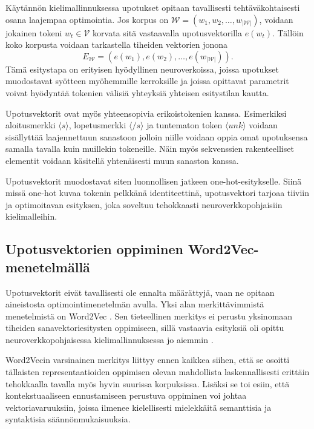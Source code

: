Käytännön kielimallinnuksessa upotukset opitaan tavallisesti tehtäväkohtaisesti
osana laajempaa optimointia. Jos korpus on
\(\mathcal{W} = (w_1, w_2, \dots, w_{|\mathcal{W}|})\), voidaan jokainen tokeni \(w_t \in \mathcal{V}\)
korvata sitä vastaavalla upotusvektorilla \(e(w_t)\). Tällöin koko korpusta
voidaan tarkastella tiheiden vektorien jonona
$$
E_{\mathcal{W}} = (e(w_1), e(w_2), \dots, e(w_{|\mathcal{W}|})).
$$
Tämä esitystapa on erityisen hyödyllinen neuroverkoissa, joissa upotukset
muodostavat syötteen myöhemmille kerroksille ja joissa opittavat parametrit
voivat hyödyntää tokenien välisiä yhteyksiä yhteisen esitystilan kautta.

Upotusvektorit ovat myös yhteensopivia erikoistokenien kanssa. Esimerkiksi
aloitusmerkki \(\langle s \rangle\), lopetusmerkki \(\langle /s \rangle\) ja
tuntematon token \(\langle unk \rangle\) voidaan sisällyttää laajennettuun
sanastoon jolloin niille voidaan oppia omat upotuksensa samalla tavalla kuin muillekin
tokeneille. Näin myös sekvenssien rakenteelliset elementit voidaan käsitellä
yhtenäisesti muun sanaston kanssa.

Upotusvektorit muodostavat siten luonnollisen jatkeen one-hot-esitykselle.
Siinä missä one-hot kuvaa tokenin pelkkänä identiteettinä, upotusvektori tarjoaa
tiiviin ja optimoitavan esityksen, joka soveltuu tehokkaasti
neuroverkkopohjaisiin kielimalleihin.

\subsection{Upotusvektorien oppiminen Word2Vec-menetelmällä}

Upotusvektorit eivät tavallisesti ole ennalta määrättyjä, vaan ne opitaan
aineistosta optimointimenetelmän avulla. Yksi alan merkittävimmistä
menetelmistä on Word2Vec \cite{mikolov2013efficient}. Sen tieteellinen merkitys
ei perustu yksinomaan tiheiden sanavektoriesitysten oppimiseen, sillä vastaavia
esityksiä oli opittu neuroverkkopohjaisessa kielimallinnuksessa jo aiemmin
\cite{bengio2003neural}.

Word2Vecin varsinainen merkitys liittyy ennen kaikkea siihen, että se osoitti
tällaisten representaatioiden oppimisen olevan mahdollista laskennallisesti
erittäin tehokkaalla tavalla myös hyvin suurissa korpuksissa. Lisäksi se toi
esiin, että kontekstuaaliseen ennustamiseen perustuva oppiminen voi johtaa
vektoriavaruuksiin, joissa ilmenee kielellisesti mielekkäitä semanttisia ja
syntaktisia säännönmukaisuuksia.


